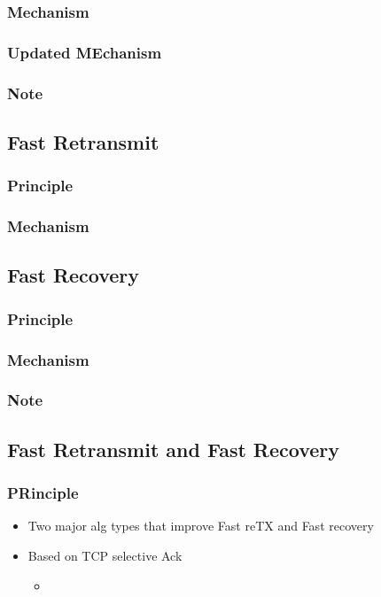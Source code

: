 \subsubsection{Mechanism}
\subsubsection{Updated MEchanism}
\subsubsection{Note}
\subsection{Fast Retransmit}
\subsubsection{Principle}
\subsubsection{Mechanism}
\subsection{Fast Recovery}
\subsubsection{Principle}
\subsubsection{Mechanism}
\subsubsection{Note}
\subsection{Fast Retransmit and Fast Recovery}
\subsubsection{PRinciple}
\begin{itemize}
	\item Two major alg types that improve Fast reTX and Fast recovery
	\item Based on TCP selective Ack
	\begin{itemize}
		\item
	\end{itemize}

\end{itemize}
